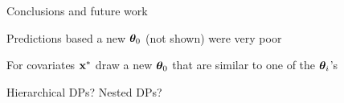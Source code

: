 \documentclass[mathserif, 12pt, t]{beamer}
\begin{document}
\begin{frame}{Conclusions and future work}

Predictions based a new $\mathbf{\bm{\theta}}_0$ (not shown) were very poor
\bigskip

For covariates $\mathbf{\bm{x}}^*$ draw a new $\mathbf{\bm{\theta}}_0$ that are similar to one of the $\mathbf{\bm{\theta}}_i$'s
\bigskip

Hierarchical DPs? Nested DPs?
\bigskip


\end{frame}


%
%
%
%
%
%
%
\end{document}
